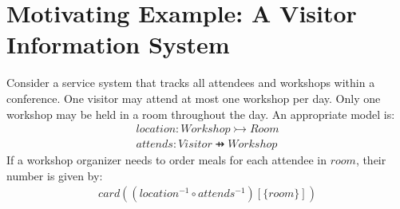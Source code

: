 \documentclass[runningheads]{llncs}
\begin{document}
\section{Motivating Example: A Visitor Information System}
Consider a service system that tracks all attendees and workshops within a conference. One visitor may attend at most one workshop per day. Only one workshop may be held in a room throughout the day. An appropriate model is:
\begin{align}
    location: Workshop \tinj Room \\
    attends: Visitor \pfun Workshop
\end{align}
If a workshop organizer needs to order meals for each attendee in $room$, their number is given by:
\begin{align}
card((location^{-1} \circ attends^{-1})[\{room\}])
\end{align}
\end{document}
